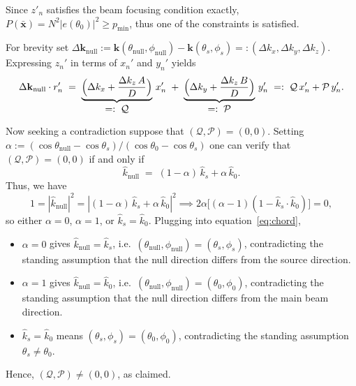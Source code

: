 \documentclass[11pt,letterpaper]{article}
\theoremstyle{definition}
\theoremstyle{plain}
\begin{document}
Since $z'_n$ satisfies the beam focusing condition exactly, $P(\mathbf{\bar{x}})=N^2\bigl|e(\theta_0)\bigr|^2 \geq  p_{\min}$, thus one of the constraints is satisfied.

For brevity set $\Delta\mathbf{k}_{\mathrm{null}}
  := \mathbf{k}(\theta_{\mathrm{null}},\phi_{\mathrm{null}})
   - \mathbf{k}(\theta_s,\phi_s)
   =: (\Delta k_x,\Delta k_y,\Delta k_z)$.
Expressing $z_n'$ in terms of $x_n'$ and $y_n'$ yields
\begin{equation}\label{eq:reduced_phase}
    \Delta\mathbf{k}_{\mathrm{null}}\cdot r'_n
    \;=\;
    \underbrace{\Bigl(\Delta k_x
              + \frac{\Delta k_z\,A}{D}\Bigr)}_{\displaystyle=:\;\mathcal{Q}}\,x'_n
    \;+\;
    \underbrace{\Bigl(\Delta k_y
              + \frac{\Delta k_z\,B}{D}\Bigr)}_{\displaystyle=:\;\mathcal{P}}\,y'_n
    \;=:\;
    \mathcal{Q}\,x'_n + \mathcal{P}\,y'_n.
\end{equation}


\medskip

Now seeking a contradiction suppose that $(\mathcal{Q},\mathcal{P})=(0,0)$.
Setting $\alpha:=(\cos\theta_{\mathrm{null}}-\cos\theta_s)/(\cos\theta_0-\cos\theta_s)$
one can verify that
$(\mathcal{Q},\mathcal{P})=(0,0)$ if and only if
\begin{equation}\label{eq:chord}
    \hat{k}_{\mathrm{null}}
    \;=\; (1-\alpha)\,\hat{k}_s + \alpha\,\hat{k}_0.
\end{equation}
Thus, we have 
\[
   1=|\hat{k}_{\mathrm{null}}|^2 = |(1-\alpha)\,\hat{k}_s + \alpha\,\hat{k}_0 |^2 \implies 2\alpha\bigl[(\alpha-1)(1-\hat{k}_s\cdot\hat{k}_0)\bigr] = 0,
\]
so either $\alpha=0$, $\alpha=1$, or $\hat{k}_s=\hat{k}_0$. Plugging into equation~\eqref{eq:chord},
\begin{itemize}[nosep]
    \item $\alpha=0$ gives $\hat{k}_{\mathrm{null}}=\hat{k}_s$,
          i.e.\ $(\theta_{\mathrm{null}},\phi_{\mathrm{null}})=(\theta_s,\phi_s)$,
          contradicting the standing assumption that the null direction differs
          from the source direction.
    \item $\alpha=1$ gives $\hat{k}_{\mathrm{null}}=\hat{k}_0$,
          i.e.\ $(\theta_{\mathrm{null}},\phi_{\mathrm{null}})=(\theta_0,\phi_0)$,
          contradicting the standing assumption that the null direction differs
          from the main beam direction.
    \item $\hat{k}_s=\hat{k}_0$ means $(\theta_s,\phi_s)=(\theta_0,\phi_0)$,
          contradicting the standing assumption $\theta_s\neq\theta_0$.
\end{itemize}
Hence, $(\mathcal{Q},\mathcal{P})\neq(0,0)$, as claimed.
\end{document}

